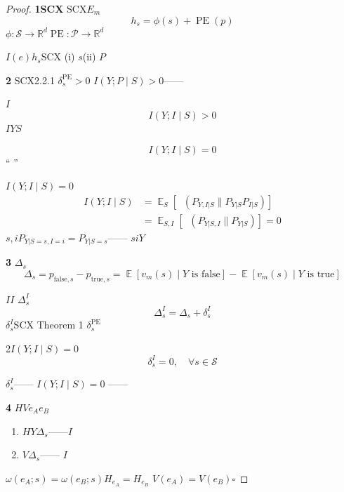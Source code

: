 \documentclass[11pt,a4paper]{article}
\DeclareMathOperator{\PE}{PE}
\theoremstyle{remark}
\DeclareMathOperator{\E}{\mathbb{E}}
\DeclareMathOperator{\KL}{D_{KL}}
\newcommand{\R}{\mathbb{R}}
\newcommand{\Sstates}{\mathcal{S}}
\newcommand{\Ppos}{\mathcal{P}}
\begin{document}
\begin{proof}
\textbf{1SCX}
SCX$E_m$
\begin{equation}
    h_s = \phi(s) + \PE(p)
\end{equation}
$\phi: \Sstates \to \R^d$$\PE: \Ppos \to \R^d$


\textbf{}$I(e)$\textbf{}$h_s$SCX
(i) $s$(ii) $P$


\textbf{2}
SCX2.2.1\cite{scx2026ppe_derivation}
$\delta_s^{\PE} > 0$
$I(Y; P \mid S) > 0$——

$I$
\begin{equation}
    I(Y; I \mid S) > 0
\end{equation}
$I$$Y$$S$

\begin{equation}
    I(Y; I \mid S) = 0
\end{equation}
\textbf{}``
''

$I(Y; I \mid S) = 0$
\begin{align}
    I(Y; I \mid S) &= \E_S\left[\KL(P_{Y,I|S} \| P_{Y|S} P_{I|S})\right] \nonumber\\
    &= \E_{S,I}\left[\KL(P_{Y|S,I} \| P_{Y|S})\right] = 0
\end{align}
$s, i$$P_{Y|S=s, I=i} = P_{Y|S=s}$——
$s$$i$$Y$

\textbf{3}
$\Delta_s$
\begin{equation}
    \Delta_s = p_{\text{false},s} - p_{\text{true},s}
    = \E[v_m(s) \mid Y \text{ is false}] - \E[v_m(s) \mid Y \text{ is true}]
\end{equation}

$I$$I$
$\Delta_s^{I}$
\begin{equation}
    \Delta_s^{I} = \Delta_s + \delta_s^{I}
\end{equation}
$\delta_s^{I}$SCX Theorem 1
$\delta_s^{\PE}$\cite{scx2026cc_audit}

2$I(Y; I \mid S) = 0$
\begin{equation}
    \delta_s^{I} = 0, \quad \forall s \in \Sstates
\end{equation}

$\delta_s^{I}$——
$I(Y; I \mid S) = 0$
——

\textbf{4}
$H$$V$$e_A$$e_B$

\begin{enumerate}[label=(\roman*)]
    \item $H$$Y$$\Delta_s$——$I$
    \item $V$$\Delta_s$——
          $I$
\end{enumerate}

$\omega(e_A; s) = \omega(e_B; s)$$H_{e_A} = H_{e_B}$
$V(e_A) = V(e_B)$\hfill $\square$
\end{proof}
\end{document}
